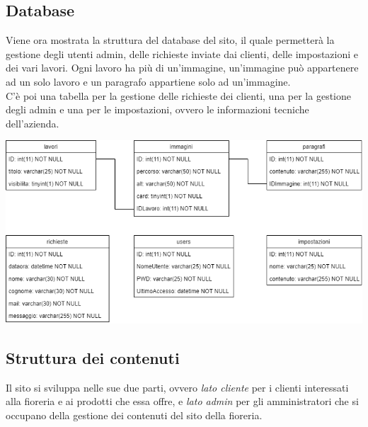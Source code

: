 \subsection{Database}
Viene ora mostrata la struttura del database del sito, il quale permetterà la gestione degli utenti admin, delle richieste inviate dai clienti, delle impostazioni e dei vari lavori. Ogni lavoro ha più di un'immagine, un'immagine può appartenere ad un solo lavoro e un paragrafo appartiene solo ad un'immagine.\\C'è poi una tabella per la gestione delle richieste dei clienti, una per la gestione degli admin e una per le impostazioni, ovvero le informazioni tecniche dell'azienda.
\begin{center}
\includegraphics[scale = 0.5]{../latex/images/db.png}\\[1.5cm]
\end{center}

\subsection{Struttura dei contenuti}
Il sito si sviluppa nelle sue due parti, ovvero \textit{lato cliente} per i clienti interessati alla fioreria e ai prodotti che essa offre, e \textit{lato admin} per gli amministratori che si occupano della gestione dei contenuti del sito della fioreria. 

